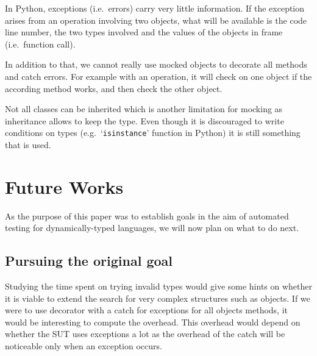 \documentclass{llncs2e/llncs}
\makeatletter
\def\todo#1{{\color{red}TODO\@: #1}}
\makeatother
\begin{document}
In Python, exceptions (i.e.\ errors) carry very little information. If the
exception arises from an operation involving two objects, what will be available
is the code line number, the two types involved and the values of the objects in
frame (i.e.\ function call).

In addition to that, we cannot really use mocked objects to decorate all methods
and catch errors. For example with an operation, it will check on one object if
the according method works, and then check the other object.

Not all classes can be inherited which is another limitation for mocking as
inheritance allows to keep the type. Even though it is discouraged to write
conditions on types (e.g.\ `\texttt{isinstance}' function in Python) it is still
something that is used.







\section{Future Works}
\label{futureworks}

As the purpose of this paper was to establish goals in the aim of automated
testing for dynamically-typed languages, we will now plan on what to do next.

\subsection{Pursuing the original goal}

Studying the time spent on trying invalid types would give some hints on whether
it is viable to extend the search for very complex structures such as objects.
If we were to use decorator with a catch for exceptions for all objects methods,
it would be interesting to compute the overhead. This overhead would depend on
whether the SUT uses exceptions a lot as the overhead of the catch will be
noticeable only when an exception occurs.

\end{document}
